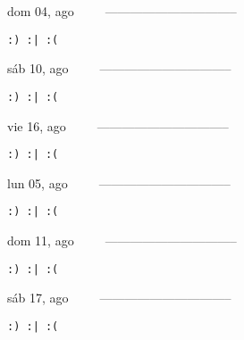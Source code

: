 \documentclass[letterpaper,10pt]{article}
\begin{document}
\begin{multicols}{3}
{dom 04, ago\ \ \ \ \ --------------------------------}
\begin{flushright}\begin{small}\texttt{:) :| :(}\end{small}\end{flushright}
\vfill
{sáb 10, ago\ \ \ \ \ --------------------------------}
\begin{flushright}\begin{small}\texttt{:) :| :(}\end{small}\end{flushright}\par
\vfill
{vie 16, ago\ \ \ \ \ --------------------------------}
\begin{flushright}\begin{small}\texttt{:) :| :(}\end{small}\end{flushright}\par
\vfill
\end{multicols}
\vspace{1.05cm}

\begin{multicols}{3}
{lun 05, ago\ \ \ \ \ --------------------------------}
\begin{flushright}\begin{small}\texttt{:) :| :(}\end{small}\end{flushright}
\vfill
{dom 11, ago\ \ \ \ \ --------------------------------}
\begin{flushright}\begin{small}\texttt{:) :| :(}\end{small}\end{flushright}\par
\vfill
{sáb 17, ago\ \ \ \ \ --------------------------------}
\begin{flushright}\begin{small}\texttt{:) :| :(}\end{small}\end{flushright}\par
\vfill
\end{multicols}
\vspace{1.05cm}
\end{document}
